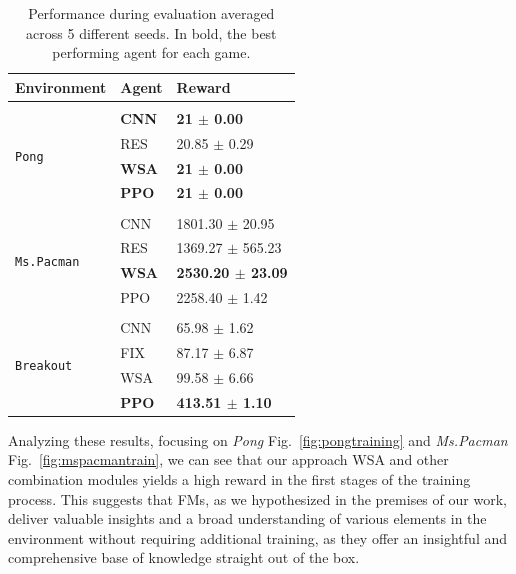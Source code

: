 \begin{table}[ht]
\centering
    \begin{tabular}[b]{lll}
                \multicolumn{1}{l}{Environment}  &\multicolumn{1}{l}{\bf Agent} &\multicolumn{1}{l}{\bf Reward} \\
                \hline \\
                \multirow{4}{*}{\texttt{Pong}} & \textbf{CNN} & \textbf{21 $\pm$ 0.00} \\
                                      & RES & 20.85 $\pm$ 0.29 \\
                                      & \textbf{WSA} & \textbf{21 $\pm$ 0.00} \\
                                      & \textbf{PPO} & \textbf{21 $\pm$ 0.00}\\

                                      \hline \\
                \multirow{4}{*}{\texttt{Ms.Pacman}} & CNN & 1801.30 $\pm$ 20.95 \\
                                      & RES & 1369.27 $\pm$ 565.23 \\
                                      &\textbf{WSA} & \textbf{2530.20 $\pm$ 23.09} \\
                                      & PPO & 2258.40 $\pm$ 1.42\\
                                      \hline \\

                \multirow{4}{*}{\texttt{Breakout}}
                                      & CNN & 65.98 $\pm$ 1.62 \\
                                      & FIX & 87.17 $\pm$ 6.87 \\
                                      & WSA & 99.58 $\pm$ 6.66 \\
                                      & \textbf{PPO} & \textbf{413.51 $\pm$ 1.10}\\
    \end{tabular}
    \caption{Performance during evaluation averaged across 5 different seeds. In bold, the best performing agent for each game.}
    \label{tab:results}
\end{table}


Analyzing these results, focusing on \textit{Pong} Fig.~\ref{fig:pongtraining} and \textit{Ms.Pacman} Fig.~\ref{fig:mspacmantrain},
we can see that our approach WSA and other combination modules yields a high reward in the first stages of the training process.
This suggests that FMs, as we hypothesized in the premises of our work, deliver valuable insights and a broad understanding of various elements in the environment without requiring additional training, as they offer an insightful and comprehensive base of knowledge straight out of the box.

